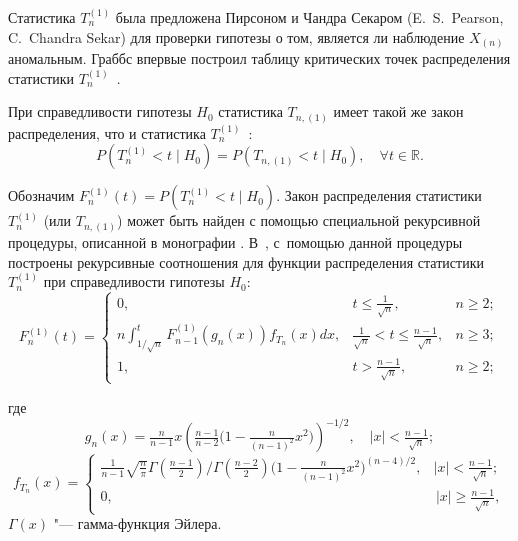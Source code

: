 Статистика $T_{n}^{(1)}$ была предложена Пирсоном и Чандра Секаром (E.~S.~Pear\-son, C.~Chandra Sekar) \cite{Pearson} для проверки гипотезы о том, является  ли наблюдение $X_{(n)}$ аномальным.
Граббс  впервые построил таблицу критических точек распределения статистики $T_{n}^{(1)}$~\cite{Grubbs}.

При справедливости гипотезы   $H_0$ статистика $T_{n,(1)}$ имеет такой же закон распределения, что и статистика $T_{n}^{(1)}$~\cite{Grubbs}:
$$ 
P(T_{n}^{(1)}<t\mid H_0)= P(T_{n,(1)}<t\mid  H_0),\quad \forall t \in \mathbb R.
$$

Обозначим $F_{n}^{(1)}(t)=P(T_{n}^{(1)}<t\mid H_0).$
Закон распределения статистики  $T_{n}^{(1)}$  (или $T_{n,(1)}$) может быть найден с помощью специальной рекурсивной процедуры, описанной в монографии \cite[pp.~115--116]{Lewis}.
В~\cite[p.~167]{Lewis}, \cite{Zhang} с~помощью данной процедуры построены рекурсивные соотношения для функции распределения статистики  $T_{n}^{(1)}$ при справедливости гипотезы $H_0$:
\begin{equation}
\label{Fn1} 
F_n^{(1)}(t)=\left\{
\begin{array}{cll}
0,& t\le \frac{1} {\sqrt{n}},&n\ge 2;\\[2mm]
\displaystyle n\int_{{1}/{\sqrt{n}}}^{t}F_{n-1}^{(1)}(g_n(x))f_{T_n}(x)dx, & \frac{1}{\sqrt{n}}<t\le \frac{n-1}{\sqrt{n}},& n\ge 3;\\[2mm]
1,& t> \frac{n-1}{\sqrt{n}}, &n\ge 2;
\end{array}
\right.
\end{equation}

\noindent
где \begin{equation}\label{gn}
g_n(x)=\tfrac{n}{n-1}x \left({\tfrac{n-1}{n-2}\bigl(1-\tfrac{n}{(n-1)^2}x^2\bigr)}\right)^{-1/2},
\quad |x|<\tfrac{n-1}{\sqrt{n}};
\end{equation}
\begin{equation}\label{fTn}
f_{T_n}(x)=\left\{
\begin{array}{cr}
\frac{1}{n-1}\sqrt{\frac{n}{\pi}}\Gamma\left(\frac{n-1}{2}\right)/
\Gamma\left(\frac{n-2}{2}\right) \bigl(1-\frac{n}{(n-1)^2}x^2\bigr)^{({n-4})/{2}},& |x|<\frac{n-1}{\sqrt{n}};\\[2mm]
0,&\,|x|\ge\frac{n-1}{\sqrt{n}},
\end{array}
\right.
\end{equation}
$\Gamma(x)$ "--- гамма-функция Эйлера.

